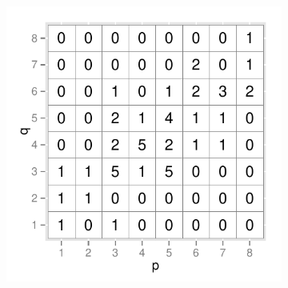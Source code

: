 \documentclass[12pt]{article}\usepackage[]{graphicx}\usepackage[]{color}
\begin{document}
\begin{figure}[!t]
\begin{subfigure}[t]{\textwidth}
\includegraphics[scale=0.55]{freq-example-1.pdf}
\end{subfigure}


\end{figure}
\end{document}
